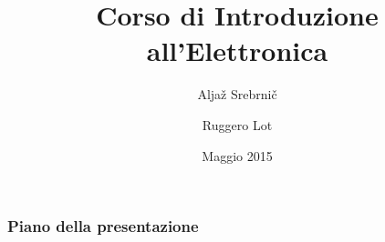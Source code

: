 \documentclass[12pt,notes=off,unicode]{beamer}
\title{Corso di Introduzione all'Elettronica}
\author[Alja\v{z}, Ruggero]{Alja\v{z} Srebrni\v{c} \and Ruggero Lot}
\date[23/5]{Maggio 2015}
\institute[Mittelab]{Mittelab}
\begin{document}
	
	\begin{frame}[c]\frametitle{}
		\maketitle
	\end{frame}

	\begin{frame}\frametitle{Piano della presentazione}
		\tableofcontents	
	\end{frame}

	
\end{document}
